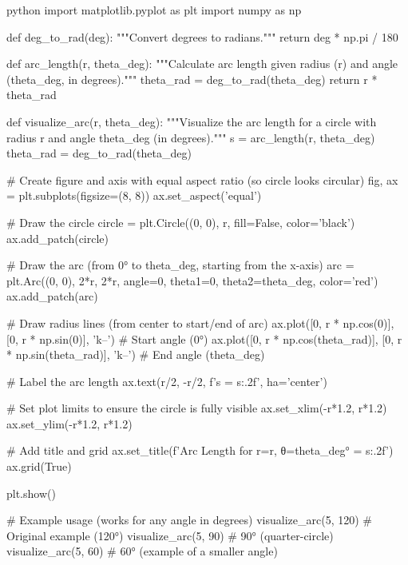 python
import matplotlib.pyplot as plt
import numpy as np

def deg_to_rad(deg):
    """Convert degrees to radians."""
    return deg * np.pi / 180

def arc_length(r, theta_deg):
    """Calculate arc length given radius (r) and angle (theta_deg, in degrees)."""
    theta_rad = deg_to_rad(theta_deg)
    return r * theta_rad

def visualize_arc(r, theta_deg):
    """Visualize the arc length for a circle with radius r and angle theta_deg (in degrees)."""
    s = arc_length(r, theta_deg)
    theta_rad = deg_to_rad(theta_deg)
    
    # Create figure and axis with equal aspect ratio (so circle looks circular)
    fig, ax = plt.subplots(figsize=(8, 8))
    ax.set_aspect('equal')
    
    # Draw the circle
    circle = plt.Circle((0, 0), r, fill=False, color='black')
    ax.add_patch(circle)
    
    # Draw the arc (from 0° to theta_deg, starting from the x-axis)
    arc = plt.Arc((0, 0), 2*r, 2*r, angle=0, theta1=0, theta2=theta_deg, color='red')
    ax.add_patch(arc)
    
    # Draw radius lines (from center to start/end of arc)
    ax.plot([0, r * np.cos(0)], [0, r * np.sin(0)], 'k--')  # Start angle (0°)
    ax.plot([0, r * np.cos(theta_rad)], [0, r * np.sin(theta_rad)], 'k--')  # End angle (theta_deg)
    
    # Label the arc length
    ax.text(r/2, -r/2, f's = {s:.2f}', ha='center')
    
    # Set plot limits to ensure the circle is fully visible
    ax.set_xlim(-r*1.2, r*1.2)
    ax.set_ylim(-r*1.2, r*1.2)
    
    # Add title and grid
    ax.set_title(f'Arc Length for r={r}, θ={theta_deg}° = {s:.2f}')
    ax.grid(True)
    
    plt.show()

# Example usage (works for any angle in degrees)
visualize_arc(5, 120)  # Original example (120°)
visualize_arc(5, 90)   # 90° (quarter-circle)
visualize_arc(5, 60)   # 60° (example of a smaller angle)